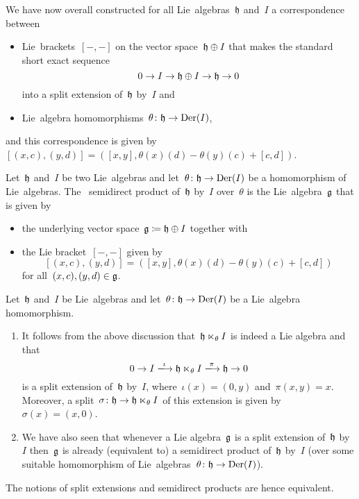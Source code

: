 \begin{example}
  We have now overall constructed for all Lie~algebras~$\mathfrak{h}$ and~$I$ a {\onetoone} correspondence between
  \begin{itemize}
    \item
      Lie~brackets~$[-,-]$ on the vector space~$\mathfrak{h} \oplus I$ that makes the standard short exact sequence
      \[
        0
        \to
        I
        \to
        \mathfrak{h}
        \oplus
        I 
        \to
        \mathfrak{h}
        \to
        0
      \]
      into a split extension of~$\mathfrak{h}$ by~$I$ and
    \item
      Lie~algebra homomorphisms~$\theta \colon \mathfrak{h} \to \operatorname{Der}(I)$,
  \end{itemize}
  and this correspondence is given by~$[(x,c), (y,d)] = ([x,y], \theta(x)(d) - \theta(y)(c) + [c,d])$.
\end{example}


\begin{definition}
  Let~$\mathfrak{h}$ and~$I$ be two Lie~algebras and let~$\theta \colon \mathfrak{h} \to \operatorname{Der}(I)$ be a homomorphism of Lie~algebras.
  The ~\gls*{semidirect product} of~$\mathfrak{h}$ by~$I$ over~$\theta$ is the Lie~algebra~$\mathfrak{g}$ that is given by
  \begin{itemize}
    \item
      the underlying vector space~$\mathfrak{g} \coloneqq \mathfrak{h} \oplus I$ together with
    \item
      the Lie bracket~$[-,-]$ given by
      \[
        [(x,c), (y,d)]
        =
        ([x,y], \theta(x)(d) - \theta(y)(c) + [c,d])
      \]
      for all~$(x,c), (y,d) \in \mathfrak{g}$.
  \end{itemize}
\end{definition}


\begin{remark}
  Let~$\mathfrak{h}$ and~$I$ be Lie~algebras and let~$\theta \colon \mathfrak{h} \to \operatorname{Der}(I)$ be a Lie~algebra homomorphism.
  \begin{enumerate}
    \item
      It follows from the above discussion that~$\mathfrak{h} \ltimes_\theta I$ is indeed a Lie algebra and that
      \[
        0
        \to
        I
        \xlongto{\iota}
        \hlie \ltimes_\theta I
        \xlongto{\pi}
        \hlie
        \to
        0
      \]
      is a split extension of~$\mathfrak{h}$ by~$I$, where~$\iota(x) = (0,y)$ and~$\pi(x,y) = x$.
      Moreover, a split~$\sigma \colon \mathfrak{h} \to \mathfrak{h} \ltimes_\theta I$ of this extension is given by~$\sigma(x) = (x,0)$.
    \item
      We have also seen that whenever a Lie algebra~$\mathfrak{g}$ is a split extension of~$\mathfrak{h}$ by~$I$ then~$\mathfrak{g}$ is already (equivalent to) a semidirect product of~$\mathfrak{h}$ by~$I$ (over some suitable homomorphism of Lie~algebras~$\theta \colon \mathfrak{h} \to \operatorname{Der}(I)$).
  \end{enumerate}
  The notions of split extensions and semidirect products are hence equivalent.
\end{remark}


